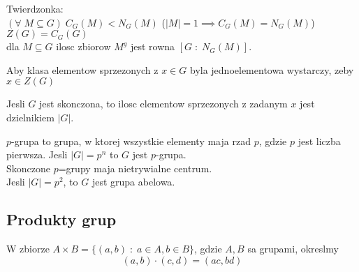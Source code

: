 \begin{multicols}{2}
    Twierdzonka:\smallskip\\
    \point $(\forall\; M\subseteq G)\;C_G(M)<N_G(M)$ ($|M| = 1\implies C_G(M)=N_G(M)$)\smallskip\\
    \point $Z(G)=C_G(G)$\smallskip\\
    \point dla $M\subseteq G$ ilosc zbiorow $M^g$ jest rowna $[G\;:\;N_G(M)]$.\medskip

    Aby klasa elementow sprzezonych z $x\in G$ byla jednoelementowa wystarczy, zeby $x\in Z(G)$\medskip
    
    Jesli $G$ jest skonczona, to ilosc elementow sprzezonych z zadanym $x$ jest dzielnikiem $|G|$.\medskip

    {\color{acc}$p$-grupa} to grupa, w ktorej wszystkie elementy maja rzad $p$, gdzie $p$ jest liczba pierwsza. Jesli $|G|=p^n$ to $G$ jest $p$-grupa.\smallskip\\
    Skonczone $p$=grupy maja {\color{acc}nietrywialne centrum}.\smallskip\\
    Jesli $|G|=p^2$, to $G$ jest grupa abelowa.

\end{multicols}\bigskip

\bigskip

\subsection{Produkty grup}
\begin{multicols*}{2}
    W zbiorze $A\times B=\{(a, b)\;:\;a\in A,b\in B\}$, gdzie $A,B$ sa grupami, okreslmy
    $$(a,b)\cdot(c,d)=(ac, bd)$$
\end{multicols*}